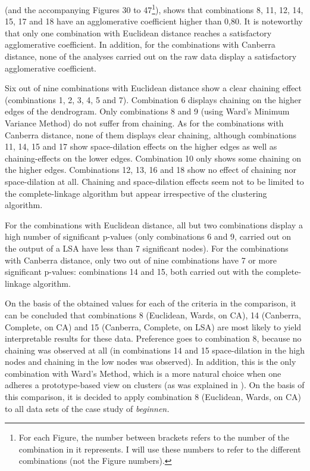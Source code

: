  (and the accompanying Figures 30 to 47\footnote{For each Figure, the number between brackets refers to the number of the combination in  it represents. I will use these numbers to refer to the different combinations (not the Figure numbers).}), shows that combinations 8, 11, 12, 14, 15, 17 and 18 have an agglomerative coefficient higher than 0,80. It is noteworthy that only one combination with Euclidean distance reaches a satisfactory agglomerative coefficient. In addition, for the combinations with Canberra distance, none of the analyses carried out on the raw data display a satisfactory agglomerative coefficient.

Six out of nine combinations with Euclidean distance show a clear chaining effect (combinations 1, 2, 3, 4, 5 and 7). Combination 6 displays chaining on the higher edges of the dendrogram. Only combinations 8 and 9 (using Ward’s Minimum Variance Method) do not suffer from chaining. As for the combinations with Canberra distance, none of them displays clear chaining, although combinations 11, 14, 15 and 17 show space-dilation effects on the higher edges as well as chaining-effects on the lower edges. Combination 10 only shows some chaining on the higher edges. Combinations 12, 13, 16 and 18 show no effect of chaining nor space-dilation at all. Chaining and space-dilation effects seem not to be limited to the complete-linkage algorithm but appear irrespective of the clustering algorithm.

For the combinations with Euclidean distance, all but two combinations display a high number of significant p-values (only combinations 6 and 9, carried out on the output of a LSA have less than 7 significant nodes). For the combinations with Canberra distance, only two out of nine combinations have 7 or more significant p-values: combinations 14 and 15, both carried out with the complete-linkage algorithm.

On the basis of the obtained values for each of the criteria in the comparison, it can be concluded that combinations 8 (Euclidean, Wards, on CA), 14 (Canberra, Complete, on CA) and 15 (Canberra, Complete, on LSA) are most likely to yield interpretable results for these data. Preference goes to combination 8, because no chaining was observed at all (in combinations 14 and 15 space-dilation in the high nodes and chaining in the low nodes was observed). In addition, this is the only combination with Ward’s Method, which is a more natural choice when one adheres a prototype-based view on clusters (as was explained in ). On the basis of this comparison, it is decided to apply combination 8 (Euclidean, Wards, on CA) to all data sets of the case study of \textit{beginnen.}

